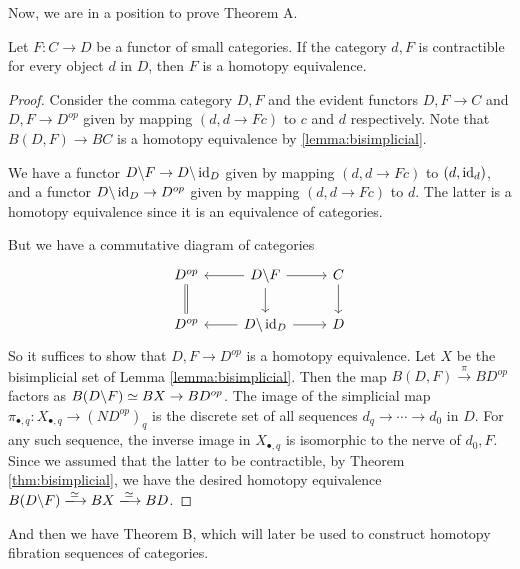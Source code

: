 Now, we are in a position to prove Theorem A. 

\begin{theorem}\label{thm:A}
Let $F : C \to D$ be a functor of small categories. If the category $d \comma F$ is contractible
for every object $d$ in $D$, then $F$ is a homotopy equivalence. 
\end{theorem}
\begin{proof}
Consider the comma category $D \comma F$ and the evident functors $D \comma F \to C$
and $D \comma F \to D^{op}$ given by mapping $(d, d \to Fc)$ to $c$ and $d$ respectively.
Note that $B(D\comma F) \to BC$ is a homotopy equivalence by \ref{lemma:bisimplicial}.

We have a functor $D\backslash F \to D\backslash\operatorname*{id}_D$ given by mapping $(d, d \to Fc)$ to $(d, \operatorname*{id}_d)$,
and a functor $D \backslash \operatorname*{id}_D \to D^{op}$ given by mapping $(d,d \to Fc)$ to $d$. The latter is a homotopy equivalence
since it is an equivalence of categories.

But we have a commutative diagram of categories 
\[
\begin{tikzcd}
D^{op} \arrow[d, equal] & D\comma F \arrow[l] \arrow[d] \arrow[r] & C \arrow[d] \\
D^{op} & D \comma \id_D \arrow[l] \arrow[r] & D
\end{tikzcd}
\]
So it suffices to show that $D \comma F \to D^{op}$ is a homotopy equivalence.
Let $X$ be the bisimplicial set of Lemma \ref{lemma:bisimplicial}. Then the map $B(D \comma F) \xrightarrow{\pi} B D^{op}$
factors as $B(D \backslash F) \simeq BX \to BD^{op}$. The image of the simplicial map $\pi_{\bullet,q} : X_{\bullet,q} \to (ND^{op})_q$
is the discrete set of all sequences $d_q \to \cdots \to d_0$ in $D$.
For any such sequence, the inverse image in $X_{\bullet, q}$ is isomorphic to the nerve of $d_0 \comma F$.
Since we assumed that the latter to be contractible, by Theorem \ref{thm:bisimplicial},
we have the desired homotopy equivalence $B(D \comma F) \xlongrightarrow\eqv BX \xlongrightarrow\eqv BD$.
\end{proof}

And then we have Theorem B, which will later be used to construct homotopy fibration sequences of categories.

